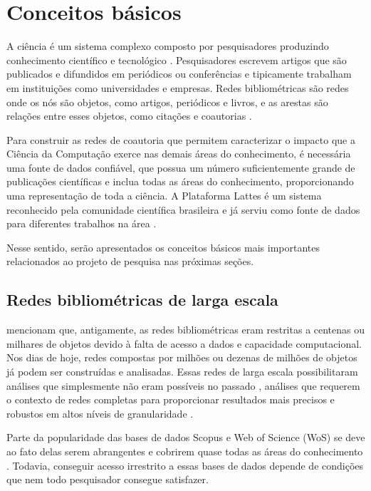 \chapter[Conceitos básicos]{Conceitos básicos}

A ciência é um sistema complexo composto por pesquisadores produzindo conhecimento científico e tecnológico \cite{boyack2019creation}. Pesquisadores escrevem artigos que são publicados e difundidos em periódicos ou conferências e tipicamente trabalham em instituições como universidades e empresas. Redes bibliométricas são redes onde os nós são objetos, como artigos, periódicos e livros, e as arestas são relações entre esses objetos, como citações e coautorias \cite{glanzel2003bibliometrics}.

Para construir as redes de coautoria que permitem caracterizar o impacto que a Ciência da Computação exerce nas demais áreas do conhecimento, é necessária uma fonte de dados confiável, que possua um número suficientemente grande de publicações científicas e inclua todas as áreas do conhecimento, proporcionando uma representação de toda a ciência. A Plataforma Lattes é um sistema reconhecido pela comunidade científica brasileira e já serviu como fonte de dados para diferentes trabalhos na área \cite{alves2011sucupira, balancieri2005analise, dias2013modelagem, mena2013prospecccao}.

Nesse sentido, serão apresentados os conceitos básicos mais importantes relacionados ao projeto de pesquisa nas próximas seções.

\section{Redes bibliométricas de larga escala}

 mencionam que, antigamente, as redes bibliométricas eram restritas a centenas ou milhares de objetos devido à falta de acesso a dados e capacidade computacional. Nos dias de hoje, redes compostas por milhões ou dezenas de milhões de objetos já podem ser construídas e analisadas. Essas redes de larga escala possibilitaram análises que simplesmente não eram possíveis no passado \cite{newman2001scientific, shiffrin2004mapping}, análises que requerem o contexto de redes completas para proporcionar resultados mais precisos e robustos em altos níveis de granularidade \cite{boyack2019creation}.

Parte da popularidade das bases de dados Scopus e Web of Science (WoS) se deve ao fato delas serem abrangentes e cobrirem quase todas as áreas do conhecimento \cite{boyack2019creation}. Todavia, conseguir acesso irrestrito a essas bases de dados depende de condições que nem todo pesquisador consegue satisfazer.


